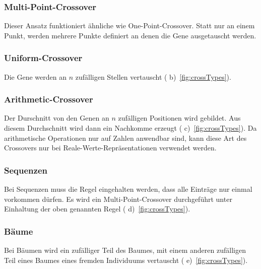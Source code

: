         \subsubsection{Multi-Point-Crossover}

          Dieser Ansatz funktioniert ähnliche wie One-Point-Crossover.
          Statt nur an einem Punkt, werden mehrere Punkte definiert an denen die Gene ausgetauscht werden.

        \subsubsection{Uniform-Crossover}

          Die Gene werden an \(n\) zufälligen Stellen vertauscht ( b)~\vref{fig:crossTypes}).

        \subsubsection{Arithmetic-Crossover}

          Der Durschnitt von den Genen an \(n\) zufälligen Positionen wird gebildet.
          Aus diesem Durchschnitt wird dann ein Nachkomme erzeugt ( c)~\vref{fig:crossTypes}).
          Da arithmetische Operationen nur auf Zahlen anwendbar sind,
          kann diese Art des Crossovers nur bei Reale-Werte-Repräsentationen verwendet werden.

        \subsubsection{Sequenzen}

          Bei Sequenzen muss die Regel eingehalten werden, dass alle Einträge nur einmal vorkommen dürfen.
          Es wird ein Multi-Point-Crossover durchgeführt unter Einhaltung der oben genannten Regel ( d)~\vref{fig:crossTypes}).

        \subsubsection{Bäume}

          Bei Bäumen wird ein zufälliger Teil des Baumes,
          mit einem anderen zufälligen Teil eines Baumes eines fremden Individuums vertauscht ( e)~\vref{fig:crossTypes}).

